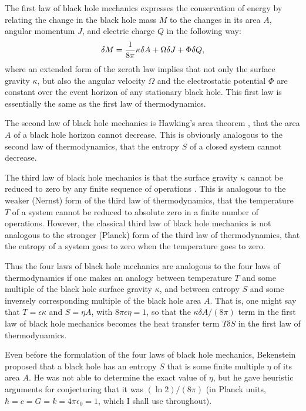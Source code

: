 \documentclass[12pt]{article} \usepackage{latexsym}
\begin{document}
The first law of black hole mechanics expresses the conservation of
energy by relating the change in the black hole mass $M$ to the
changes in its area $A$, angular momentum $J$, and electric charge $Q$
in the following way:
 \begin{equation}
 \delta M = {1\over 8\pi} \kappa \delta A + \Omega \delta J
    + \Phi \delta Q,
 \label{eq:1}
 \end{equation}
where an extended form of the zeroth law implies that not only the
surface gravity $\kappa$, but also the angular velocity $\Omega$ and
the electrostatic potential $\Phi$ are constant over the event horizon
of any stationary black hole.  This first law is essentially the same
as the first law of thermodynamics.

The second law of black hole mechanics is Hawking's area theorem
\cite{Hawkingarea}, that the area $A$ of a black hole horizon cannot
decrease.  This is obviously analogous to the second law of
thermodynamics, that the entropy $S$ of a closed system cannot
decrease.

The third law of black hole mechanics is that the surface gravity
$\kappa$ cannot be reduced to zero by any finite sequence of
operations \cite{Israel}.  This is analogous to the weaker (Nernst)
form of the third law of thermodynamics, that the temperature $T$ of a
system cannot be reduced to absolute zero in a finite number of
operations.  However, the classical third law of black hole mechanics
is not analogous to the stronger (Planck) form of the third law of
thermodynamics, that the entropy of a system goes to zero when the
temperature goes to zero.

Thus the four laws of black hole mechanics are analogous to the four
laws of thermodynamics if one makes an analogy between temperature $T$
and some multiple of the black hole surface gravity $\kappa$, and
between entropy $S$ and some inversely corresponding multiple of the
black hole area $A$.  That is, one might say that $T = \epsilon
\kappa$ and $S = \eta A$, with $8\pi\epsilon\eta = 1$, so that the
$\kappa \delta A/(8\pi)$ term in the first law of black hole mechanics
becomes the heat transfer term $T\delta S$ in the first law of
thermodynamics.

Even before the formulation of the four laws of black hole mechanics,
Bekenstein \cite{Bek1,Bek2,Bek3,Bek4} proposed that a black hole has
an entropy $S$ that is some finite multiple $\eta$ of its area $A$.
He was not able to determine the exact value of $\eta$, but he gave
heuristic arguments for conjecturing that it was $(\ln 2)/(8\pi)$ (in
Planck units, $\hbar = c = G = k = 4\pi\epsilon_0 = 1$, which I shall
use throughout).
\end{document}
